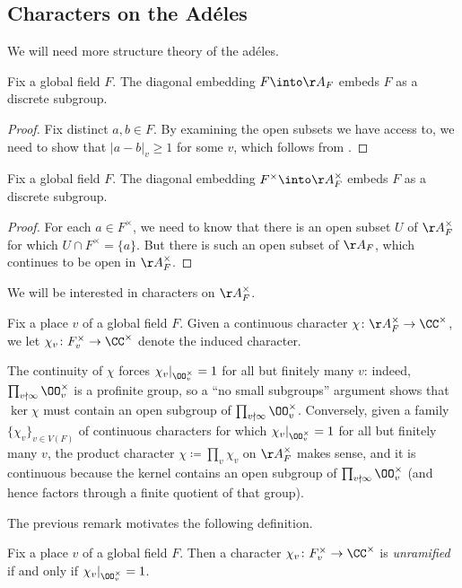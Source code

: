 \documentclass[../notes.tex]{subfiles}
\begin{document}
\subsection{Characters on the Ad\'eles}
We will need more structure theory of the ad\'eles.
\begin{proposition}
	Fix a global field $F$. The diagonal embedding $F\into\AA_F$ embeds $F$ as a discrete subgroup.
\end{proposition}
\begin{proof}
	Fix distinct $a,b\in F$. By examining the open subsets we have access to, we need to show that $\left|a-b\right|_v\ge1$ for some $v$, which follows from .
\end{proof}
\begin{corollary} \label{cor:units-embed-adele}
	Fix a global field $F$. The diagonal embedding $F^\times\into\AA_F^\times$ embeds $F$ as a discrete subgroup.
\end{corollary}
\begin{proof}
	For each $a\in F^\times$, we need to know that there is an open subset $U$ of $\AA_F^\times$ for which $U\cap F^\times=\{a\}$. But there is such an open subset of $\AA_F$, which continues to be open in $\AA_F^\times$.
\end{proof}
We will be interested in characters on $\AA_F^\times$.
\begin{notation}
	Fix a place $v$ of a global field $F$. Given a continuous character $\chi\colon\AA_F^\times\to\CC^\times$, we let $\chi_v\colon F_v^\times\to\CC^\times$ denote the induced character.
\end{notation}
\begin{remark}
	The continuity of $\chi$ forces $\chi_v|_{\OO_v^\times}=1$ for all but finitely many $v$: indeed, $\prod_{v\nmid\infty}\OO_v^\times$ is a profinite group, so a ``no small subgroups'' argument shows that $\ker\chi$ must contain an open subgroup of $\prod_{v\nmid\infty}\OO_v^\times$. Conversely, given a family $\{\chi_v\}_{v\in V(F)}$ of continuous characters for which $\chi_v|_{\OO_v^\times}=1$ for all but finitely many $v$, the product character $\chi\coloneqq\prod_v\chi_v$ on $\AA_F^\times$ makes sense, and it is continuous because the kernel contains an open subgroup of $\prod_{v\nmid\infty}\OO_v^\times$ (and hence factors through a finite quotient of that group).
\end{remark}
The previous remark motivates the following definition.
\begin{definition}[unramified]
	Fix a place $v$ of a global field $F$. Then a character $\chi_v\colon F_v^\times\to\CC^\times$ is \textit{unramified} if and only if $\chi_v|_{\OO_v^\times}=1$.
\end{definition}
\end{document}

